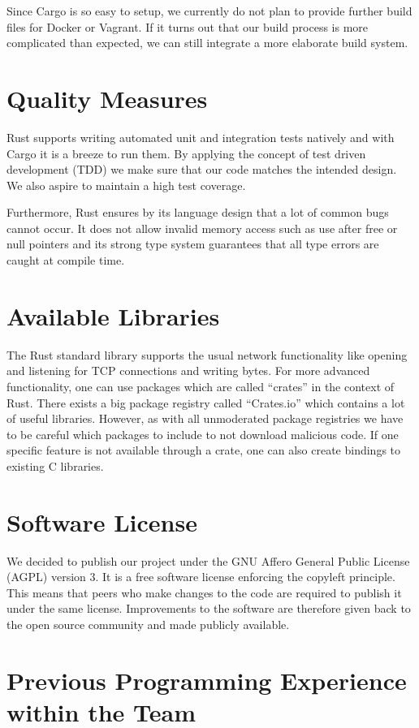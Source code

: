 \documentclass[a4paper, 11pt]{article}
\begin{document}
Since Cargo is so easy to setup, we currently do not plan to provide further build files for Docker or Vagrant. If it turns out that our build process is more complicated than expected, we can still integrate a more elaborate build system.

\section*{Quality Measures}
Rust supports writing automated unit and integration tests natively and with Cargo it is a breeze to run them. By applying the concept of test driven development (TDD) we make sure that our code matches the intended design. We also aspire to maintain a high test coverage.

Furthermore, Rust ensures by its language design that a lot of common bugs cannot occur. It does not allow invalid memory access such as use after free or null pointers and its strong type system guarantees that all type errors are caught at compile time.

\section*{Available Libraries}
The Rust standard library supports the usual network functionality like opening and listening for TCP connections and writing bytes. For more advanced functionality, one can use packages which are called ``crates'' in the context of Rust. There exists a big package registry called ``Crates.io'' \cite{Crates} which contains a lot of useful libraries. However, as with all unmoderated package registries we have to be careful which packages to include to not download malicious code. If one specific feature is not available through a crate, one can also create bindings to existing C libraries.

\section*{Software License}
We decided to publish our project under the GNU Affero General Public License (AGPL) version 3. \cite{AGPL} It is a free software license enforcing the copyleft principle. This means that peers who make changes to the code are required to publish it under the same license. Improvements to the software are therefore given back to the open source community and made publicly available. 

\section*{Previous Programming Experience within the Team}
\lipsum[7]
\end{document}
